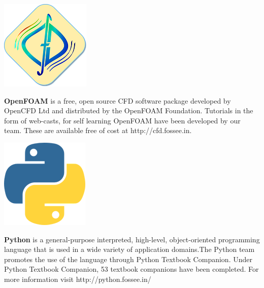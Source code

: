 \documentclass{letter}
\begin{document}
\begin{minipage}[t]{0.5\linewidth}
    \begin{center}
        \includegraphics[width=0.37\linewidth]{images/cfd_logo.png}
    \end{center}
\textbf{OpenFOAM} is a free, open source CFD software package developed by 
OpenCFD Ltd and distributed by the OpenFOAM Foundation. Tutorials in the form of 
web-casts, for self learning OpenFOAM have been developed by our team. These are 
available free of cost at http://cfd.fossee.in.
\end{minipage} \hspace{1cm}
\begin{minipage}[t]{0.5\linewidth}
    \begin{center}
        \includegraphics[width=0.35\linewidth]{images/python_logo.png}
    \end{center}
\textbf{Python} is a general-purpose interpreted, high-level, object-oriented 
programming language that is used in a wide variety of application domains.The 
Python team promotes the use of the language through Python Textbook Companion.  
Under Python Textbook Companion, 53 textbook companions have been completed. For 
more information visit http://python.fossee.in/
\end{minipage}
\end{document}
